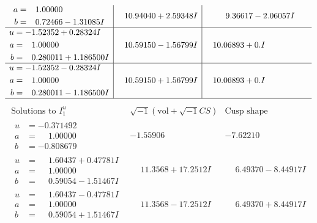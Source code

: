 \documentclass[1p]{elsarticle_modified}
\theoremstyle{definition}
\newcommand{\I}{\sqrt{-1}}
\begin{document}
$$\begin{array}{c|c|c}
\begin{aligned}
a &= \phantom{-}1.00000\phantom{ +0.000000I} \\
b &= \phantom{-}0.72466 - 1.31085 I\end{aligned}
 & \phantom{-}10.94040 + 2.59348 I & \phantom{-}9.36617 - 2.06057 I \\ \hline\begin{aligned}
u &= -1.52352 + 0.28324 I \\
a &= \phantom{-}1.00000\phantom{ +0.000000I} \\
b &= \phantom{-}0.280011 + 1.186500 I\end{aligned}
 & \phantom{-}10.59150 - 1.56799 I & \phantom{-}10.06893 + 0. I\phantom{ +0.000000I} \\ \hline\begin{aligned}
u &= -1.52352 - 0.28324 I \\
a &= \phantom{-}1.00000\phantom{ +0.000000I} \\
b &= \phantom{-}0.280011 - 1.186500 I\end{aligned}
 & \phantom{-}10.59150 + 1.56799 I & \phantom{-}10.06893 + 0. I\phantom{ +0.000000I}\\
 \hline 
 \end{array}$$\newpage$$\begin{array}{c|c|c}  
\text{Solutions to }I^u_{1}& \I (\text{vol} + \sqrt{-1}CS) & \text{Cusp shape}\\
 \hline 
\begin{aligned}
u &= -0.371492\phantom{ +0.000000I} \\
a &= \phantom{-}1.00000\phantom{ +0.000000I} \\
b &= -0.808679\phantom{ +0.000000I}\end{aligned}
 & -1.55906\phantom{ +0.000000I} & -7.62210\phantom{ +0.000000I} \\ \hline\begin{aligned}
u &= \phantom{-}1.60437 + 0.47781 I \\
a &= \phantom{-}1.00000\phantom{ +0.000000I} \\
b &= \phantom{-}0.59054 - 1.51467 I\end{aligned}
 & \phantom{-}11.3568 + 17.2512 I & \phantom{-}6.49370 - 8.44917 I \\ \hline\begin{aligned}
u &= \phantom{-}1.60437 - 0.47781 I \\
a &= \phantom{-}1.00000\phantom{ +0.000000I} \\
b &= \phantom{-}0.59054 + 1.51467 I\end{aligned}
 & \phantom{-}11.3568 - 17.2512 I & \phantom{-}6.49370 + 8.44917 I \\ \hline\begin{aligned}

\end{aligned}
\end{array}$$
\end{document}
